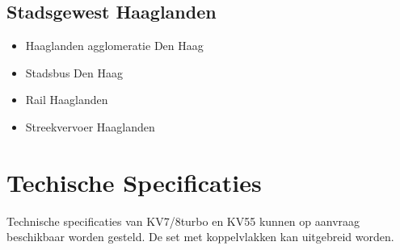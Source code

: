 \documentclass[10pt, a4paper]{article}
\begin{document}
\subsection*{Stadsgewest Haaglanden}
\begin{itemize}
\item Haaglanden agglomeratie Den Haag
\item Stadsbus Den Haag
\item Rail Haaglanden
\item Streekvervoer Haaglanden
\end{itemize}

\section{Techische Specificaties}
Technische specificaties van KV7/8turbo en KV55 kunnen op aanvraag beschikbaar worden gesteld. De set met koppelvlakken kan uitgebreid worden.
\end{document}
